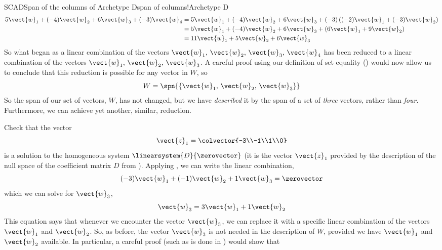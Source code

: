 \begin{example}{SCAD}{Span of the columns of Archetype D}{span of columns!Archetype D}
%
\begin{align*}
5\vect{w}_1+(-4)\vect{w}_2+6\vect{w}_3+(-3)\vect{w}_4&=
5\vect{w}_1+(-4)\vect{w}_2+6\vect{w}_3+(-3)\left((-2)\vect{w}_1+(-3)\vect{w}_2\right)\\
&=5\vect{w}_1+(-4)\vect{w}_2+6\vect{w}_3+\left(6\vect{w}_1+9\vect{w}_2\right)\\
&=11\vect{w}_1+5\vect{w}_2+6\vect{w}_3
\end{align*}
%
So what began as a linear combination of the vectors $\vect{w}_1,\,\vect{w}_2,\,\vect{w}_3,\,\vect{w}_4$ has been reduced to a linear combination of the vectors $\vect{w}_1,\,\vect{w}_2,\,\vect{w}_3$.  A careful proof using our definition of set equality () would now allow us to conclude that this reduction is possible for any vector in $W$, so
%
\begin{equation*}
W=\spn{\left\{\vect{w}_1,\,\vect{w}_2,\,\vect{w}_3\right\}}
\end{equation*}
%
So the span of our set of vectors, $W$, has not changed, but we have {\em described} it by the span of a set of {\em three} vectors, rather than {\em four}.  Furthermore, we can achieve yet another, similar, reduction.\par
%
Check that the vector
%
\begin{equation*}
\vect{z}_1=\colvector{-3\\-1\\1\\0}
\end{equation*}
%
is a solution to the homogeneous system $\linearsystem{D}{\zerovector}$ (it is the  vector $\vect{z}_1$ provided by the description of the null space of the coefficient matrix $D$ from ).  Applying , we can write the linear combination,
%
\begin{equation*}
(-3)\vect{w}_1+(-1)\vect{w}_2+1\vect{w}_3=\zerovector
\end{equation*}
%
which we can solve for $\vect{w}_3$,
%
\begin{equation*}
\vect{w}_3=3\vect{w}_1+1\vect{w}_2
\end{equation*}
%
This equation says that whenever we encounter the vector $\vect{w}_3$, we can replace it with a specific linear combination of the vectors $\vect{w}_1$ and $\vect{w}_2$.  So, as before, the vector $\vect{w}_3$ is not needed in the description of $W$, provided we have $\vect{w}_1$ and $\vect{w}_2$ available.  In particular, a careful proof (such as is done in ) would show that

\end{example}
